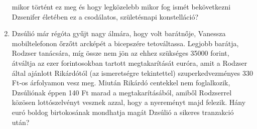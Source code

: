 \documentclass[a4paper, 12pt]{article}
\begin{document}
\begin{enumerate}
            mikor történt ez meg és hogy legközelebb mikor fog ismét bekövetkezni
            Dzsenifer életében ez a csodálatos, születésnapi konstelláció?
            \item Dzsúlió már régóta gyűjt nagy álmára, hogy volt barátnője, Vanessza
            mobiltelefonon őrzőtt arcképét a bicepszére tetováltassa. Legjobb barátja,
            Rodzser tanácsára, míg össze nem jön az ehhez szükséges 35000 forint,
            átváltja az ezer forintosokban tartott megtakarítását euróra, amit a
            Rodzser által ajánlott Rikárdótól (az ismeretségre tekintettel)
            szuperkedvezményes 330 Ft-os árfolyamon vesz meg. Miután Rikárdó centekkel
            nem foglalkozik, Dzsúliónak éppen 140 Ft marad a megtakarításából, amiből
            Rodzserrel közösen lottószelvényt vesznek azzal, hogy a nyereményt majd
            felezik. Hány euró boldog birtokosának mondhatja magát Dzsúlió a sikeres
            tranzakció után?
            
        \end{enumerate}
    
    
\end{document}
